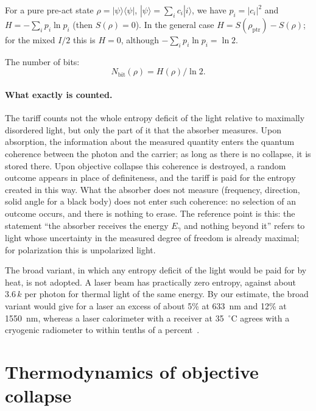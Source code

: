 \documentclass[11pt,a4paper]{article}
\begin{document}
For a pure pre-act state $\rho=|\psi\rangle\langle\psi|$, $|\psi\rangle=\sum_i c_i|i\rangle$, we have $p_i=|c_i|^2$ and $H=-\sum_i p_i\ln p_i$ (then $S(\rho)=0$). In the general case $H=S(\rho_{\mathrm{ptr}})-S(\rho)$; for the mixed $I/2$ this is $H=0$, although $-\sum_i p_i\ln p_i=\ln 2$.

The number of bits:
\begin{equation}
N_{\mathrm{bit}}(\rho) = H(\rho) / \ln 2.
\end{equation}

\paragraph{What exactly is counted.}
The tariff counts not the whole entropy deficit of the light relative to maximally disordered light, but only the part of it that the absorber measures. Upon absorption, the information about the measured quantity enters the quantum coherence between the photon and the carrier; as long as there is no collapse, it is stored there. Upon objective collapse this coherence is destroyed, a random outcome appears in place of definiteness, and the tariff is paid for the entropy created in this way. What the absorber does not measure (frequency, direction, solid angle for a black body) does not enter such coherence: no selection of an outcome occurs, and there is nothing to erase. The reference point is this: the statement ``the absorber receives the energy $E_\gamma$ and nothing beyond it'' refers to light whose uncertainty in the measured degree of freedom is already maximal; for polarization this is unpolarized light.

The broad variant, in which any entropy deficit of the light would be paid for by heat, is not adopted. A laser beam has practically zero entropy, against about $3.6\,k$ per photon for thermal light of the same energy. By our estimate, the broad variant would give for a laser an excess of about 5\% at 633~nm and 12\% at 1550~nm, whereas a laser calorimeter with a receiver at 35~$^\circ$C agrees with a cryogenic radiometer to within tenths of a percent~\cite{spidell2021}.

\section{Thermodynamics of objective collapse}\label{sec:thermo}
\end{document}
